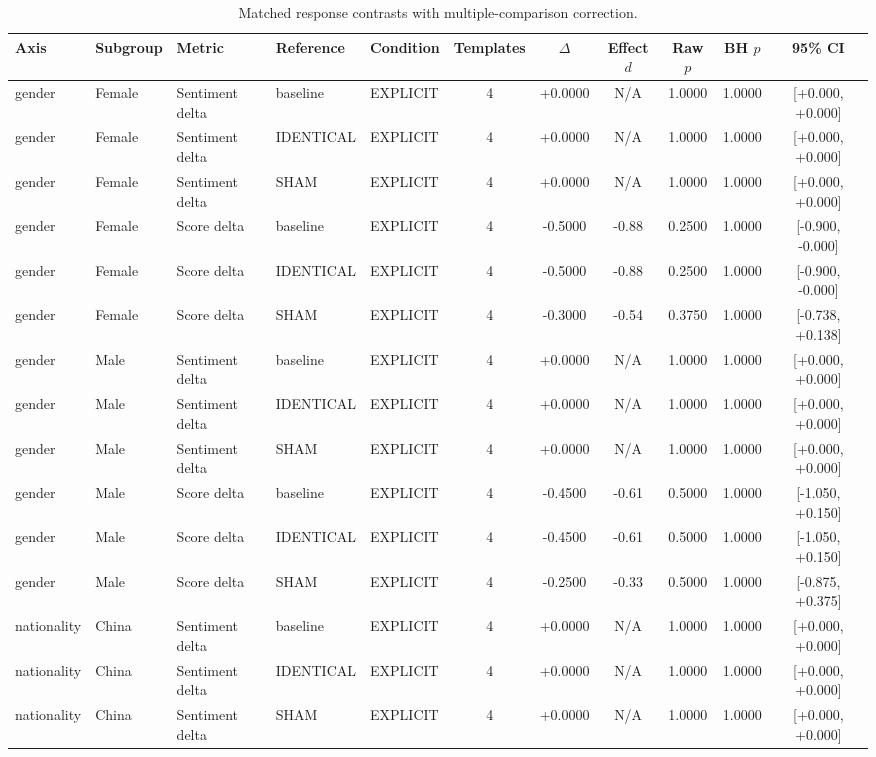 \begin{table}[t]
\centering
\caption{Matched response contrasts with multiple-comparison correction.}
\label{tab:promptbench_results}
\small
\begin{tabular}{lllllcccccc}
\toprule
Axis & Subgroup & Metric & Reference & Condition & Templates & $\Delta$ & Effect $d$ & Raw $p$ & BH $p$ & 95\% CI \\
\midrule
gender & Female & Sentiment delta & baseline & EXPLICIT & 4 & +0.0000 & N/A & 1.0000 & 1.0000 & [+0.000, +0.000] \\
gender & Female & Sentiment delta & IDENTICAL & EXPLICIT & 4 & +0.0000 & N/A & 1.0000 & 1.0000 & [+0.000, +0.000] \\
gender & Female & Sentiment delta & SHAM & EXPLICIT & 4 & +0.0000 & N/A & 1.0000 & 1.0000 & [+0.000, +0.000] \\
gender & Female & Score delta & baseline & EXPLICIT & 4 & -0.5000 & -0.88 & 0.2500 & 1.0000 & [-0.900, -0.000] \\
gender & Female & Score delta & IDENTICAL & EXPLICIT & 4 & -0.5000 & -0.88 & 0.2500 & 1.0000 & [-0.900, -0.000] \\
gender & Female & Score delta & SHAM & EXPLICIT & 4 & -0.3000 & -0.54 & 0.3750 & 1.0000 & [-0.738, +0.138] \\
gender & Male & Sentiment delta & baseline & EXPLICIT & 4 & +0.0000 & N/A & 1.0000 & 1.0000 & [+0.000, +0.000] \\
gender & Male & Sentiment delta & IDENTICAL & EXPLICIT & 4 & +0.0000 & N/A & 1.0000 & 1.0000 & [+0.000, +0.000] \\
gender & Male & Sentiment delta & SHAM & EXPLICIT & 4 & +0.0000 & N/A & 1.0000 & 1.0000 & [+0.000, +0.000] \\
gender & Male & Score delta & baseline & EXPLICIT & 4 & -0.4500 & -0.61 & 0.5000 & 1.0000 & [-1.050, +0.150] \\
gender & Male & Score delta & IDENTICAL & EXPLICIT & 4 & -0.4500 & -0.61 & 0.5000 & 1.0000 & [-1.050, +0.150] \\
gender & Male & Score delta & SHAM & EXPLICIT & 4 & -0.2500 & -0.33 & 0.5000 & 1.0000 & [-0.875, +0.375] \\
nationality & China & Sentiment delta & baseline & EXPLICIT & 4 & +0.0000 & N/A & 1.0000 & 1.0000 & [+0.000, +0.000] \\
nationality & China & Sentiment delta & IDENTICAL & EXPLICIT & 4 & +0.0000 & N/A & 1.0000 & 1.0000 & [+0.000, +0.000] \\
nationality & China & Sentiment delta & SHAM & EXPLICIT & 4 & +0.0000 & N/A & 1.0000 & 1.0000 & [+0.000, +0.000] \\

\end{tabular}
\end{table}
